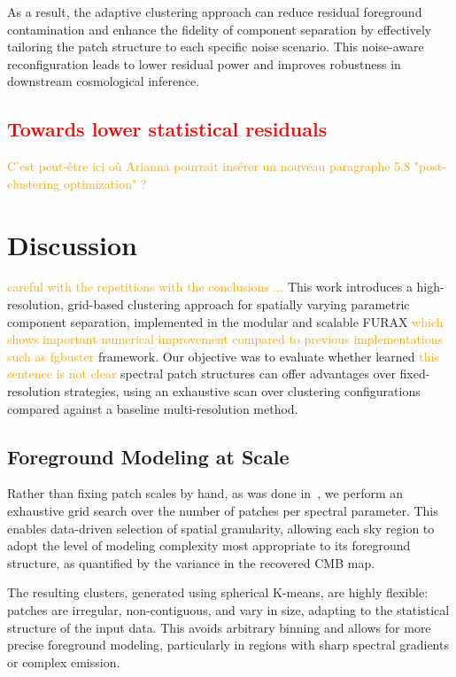 \documentclass[fleqn,usenatbib]{mnras}
\newcommand{\ar}[1]{\textcolor{red}{#1}}
\newcommand{\je}[1]{\textcolor{orange}{#1}}
\begin{document}
As a result, the adaptive clustering approach can reduce residual foreground contamination and enhance the fidelity of component separation by effectively tailoring the patch structure to each specific noise scenario. This noise-aware reconfiguration leads to lower residual power and improves robustness in downstream cosmological inference.

\ar{\section{Towards lower statistical residuals}}


\je{C'est peut-être ici où Arianna pourrait insérer un nouveau paragraphe 5.8 
"post-clustering optimization" ?}

\section{Discussion}
\label{sec:discussion}

\je{careful with the repetitions with the conclusions ...} This work introduces a high-resolution, grid-based clustering approach for spatially varying parametric component separation, implemented in the modular and scalable \textsc{FURAX} \je{which shows important numerical improvement compared to previous implementations such as fgbuster} framework. Our objective was to evaluate whether learned \je{this sentence is not clear} spectral patch structures can offer advantages over fixed-resolution strategies, using an exhaustive scan over clustering configurations compared against a baseline multi-resolution method.

\subsection*{Foreground Modeling at Scale}

Rather than fixing patch scales by hand, as was done in~\citep{LiteBIRD_PTEP_2022}, we perform an exhaustive grid search over the number of patches per spectral parameter. This enables data-driven selection of spatial granularity, allowing each sky region to adopt the level of modeling complexity most appropriate to its foreground structure, as quantified by the variance in the recovered CMB map.

The resulting clusters, generated using spherical K-means, are highly flexible: patches are irregular, non-contiguous, and vary in size, adapting to the statistical structure of the input data. This avoids arbitrary binning and allows for more precise foreground modeling, particularly in regions with sharp spectral gradients or complex emission.
\end{document}
